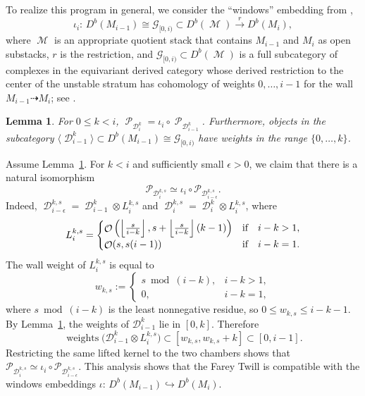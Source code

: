 \documentclass[11pt,letterpaper]{amsart}
\theoremstyle{plain}
\newtheorem{lemma}[theorem]{Lemma}
\theoremstyle{definition}
\theoremstyle{remark}
\numberwithin{equation}{section}
\DeclareMathOperator{\cD}{\mathcal{D}}
\DeclareMathOperator{\cM}{\mathcal{M}}
\DeclareMathOperator{\cO}{\mathcal{O}}
\DeclareMathOperator{\cP}{\mathcal{P}}
\begin{document}
To realize this program in general, we consider the ``windows'' embedding 
from \cite[Proposition 3.18]{TT},
\begin{equation}\label{windowsembedding}
\iota_i:\,D^b(M_{i-1})\cong\mathcal G_{[0,i)}\subset D^b(\cM)\mathop{\to}\limits^{r} D^b(M_i),
\end{equation}
where $\cM$ is an appropriate quotient stack that contains  $M_{i-1}$ and $M_i$ as open substacks, $r$
is the restriction, and  $\mathcal G_{[0,i)}\subset D^b(\cM)$ is a full subcategory  of complexes in the equivariant derived category
whose derived restriction to the center of the unstable stratum has
cohomology of weights $0,\ldots,i-1$ for the wall
$M_{i-1}\dashrightarrow M_i$; see \cite[Theorem~3.21]{TT}. 



\begin{lemma}\label{dfbadnsetn}
For $0\le k<i$, $\cP_{\cD^k_{i}}=\iota_i\circ \cP_{\cD^k_{i-1}}$.
Furthermore, objects in the subcategory $\langle\cD^k_{i-1}\rangle\subset D^b(M_{i-1})\cong\mathcal G_{[0,i)}$ have weights in the range $\{0,\ldots,k\}$.
\end{lemma}

Assume Lemma~\ref{dfbadnsetn}.  For $k<i$ and sufficiently small
$\epsilon>0$, we claim that there is a natural isomorphism
\[
 \mathcal P_{\mathcal D_i^{k,s}}
 \simeq \iota_i\circ\mathcal P_{\mathcal D_{i-\epsilon}^{k,s}}.
\]
Indeed, $\cD^{k,s}_{i-\epsilon}=\cD^k_{i-1}\otimes L^{k,s}_i$ and $\cD^{k,s}_{i}=\cD^k_{i}\otimes L^{k,s}_i$, where
$$L^{k,s}_i
=\begin{cases}
\cO\left(
\left\lfloor{s\over i-k}\right\rfloor, s+\left\lfloor{s\over i-k}\right\rfloor(k-1)\right)&\hbox{\rm if}\quad i-k>1,\cr
\cO(s,s(i-1)) &\hbox{\rm if}\quad i-k=1.\cr
\end{cases}
$$
The wall weight of
$L_i^{k,s}$ is equal to 
\[
 w_{k,s}:=
 \begin{cases}
 s\bmod(i-k),&i-k>1,\\
 0,&i-k=1,
 \end{cases}
\]
where $s\bmod(i-k)$ is the least nonnegative residue, so
$
 0\le w_{k,s}\le i-k-1$.
By Lemma~\ref{dfbadnsetn}, the weights of
$\mathcal D_{i-1}^k$ lie in $[0,k]$.  Therefore
\[
 \operatorname{weights}
 \bigl(\mathcal D_{i-1}^k\otimes L_i^{k,s}\bigr)
 \subset[w_{k,s},w_{k,s}+k]
 \subset[0,i-1].
\]
Restricting the same lifted kernel
to the two chambers shows that
$
 \mathcal P_{\mathcal D_i^{k,s}}
 \simeq
 \iota_i\circ\mathcal P_{\mathcal D_{i-\epsilon}^{k,s}}
$.
This analysis shows that the Farey Twill is compatible with the windows embeddings
$\iota:\,D^b(M_{i-1})\hookrightarrow D^b(M_i)$.
\end{document}
